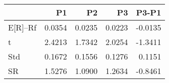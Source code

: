 \begin{tabular}{lrrrr}
\toprule
 & P1 & P2 & P3 & P3-P1 \\
\midrule
E[R]--Rf & 0.0354 & 0.0235 & 0.0223 & -0.0135 \\
t & 2.4213 & 1.7342 & 2.0254 & -1.3411 \\
Std & 0.1672 & 0.1556 & 0.1276 & 0.1151 \\
SR & 1.5276 & 1.0900 & 1.2634 & -0.8461 \\
\bottomrule
\end{tabular}
